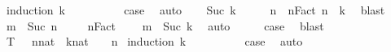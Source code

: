 \begin{isabellebody}
%
\isadelimproof
%
\endisadelimproof
%
\isatagproof
{}\isamarkupfalse%
\ {\isacharparenleft}{\kern0pt}induction\ k{\isacharparenright}{\kern0pt}\isanewline
\ \ \isamarkupfalse%
\ {}\isanewline
\ \ \isamarkupfalse%
\ \isamarkupfalse%
\ {\isacharquery}{\kern0pt}case\ \isamarkupfalse%
\ auto\isanewline
{}\isamarkupfalse%
\isanewline
\ \ \isamarkupfalse%
\ {\isacharparenleft}{\kern0pt}Suc\ k{\isacharparenright}{\kern0pt}\isanewline
\ \ \isamarkupfalse%
\ \isamarkupfalse%
\ n\ \ nFact{\isacharcolon}{\kern0pt}\ {\isachardoublequoteopen}{}{\isacharasterisk}{\kern0pt}n\ {\isachargreater}{\kern0pt}\ k{\isachardoublequoteclose}\ \isamarkupfalse%
\ blast\isanewline
\ \ \isamarkupfalse%
\ {\isacharquery}{\kern0pt}m\ {\isacharequal}{\kern0pt}\ {\isachardoublequoteopen}Suc\ n{\isachardoublequoteclose}\ \isanewline
\ \ \isamarkupfalse%
\ nFact\ \isamarkupfalse%
\ {\isachardoublequoteopen}{}\ {\isacharasterisk}{\kern0pt}\ {\isacharquery}{\kern0pt}m\ {\isachargreater}{\kern0pt}\ Suc\ k{\isachardoublequoteclose}\ \isamarkupfalse%
\ auto\isanewline
\ \ \isamarkupfalse%
\ \isamarkupfalse%
\ {\isacharquery}{\kern0pt}case\ \isamarkupfalse%
\ blast\isanewline
{}\isamarkupfalse%
%
\endisatagproof
{\isafoldproof}%
%
\isadelimproof
\isanewline
%
\endisadelimproof
\isanewline
\isanewline
{}\isamarkupfalse%
\ {\isachardoublequoteopen}T{}{\isachardoublequoteclose}{\isacharcolon}{\kern0pt}\ {\isachardoublequoteopen}\ {\isasymexists}\ {\isacharparenleft}{\kern0pt}n{\isacharcolon}{\kern0pt}{\isacharcolon}{\kern0pt}nat{\isacharparenright}{\kern0pt}\ {\isachardot}{\kern0pt}\ {\isacharparenleft}{\kern0pt}k{\isacharcolon}{\kern0pt}{\isacharcolon}{\kern0pt}nat{\isacharparenright}{\kern0pt}\ {\isacharplus}{\kern0pt}\ {}\ {\isacharless}{\kern0pt}\ n{\isachardoublequoteclose}\isanewline
%
\isadelimproof
%
\endisadelimproof
%
\isatagproof
{}\isamarkupfalse%
\ {\isacharparenleft}{\kern0pt}induction\ k{\isacharparenright}{\kern0pt}\isanewline
\ \ \isamarkupfalse%
\ {}\isanewline
\ \ \isamarkupfalse%
\ \isamarkupfalse%
\ {\isacharquery}{\kern0pt}case\ \isamarkupfalse%
\ auto\isanewline
{}\isamarkupfalse%
\isanewline

\end{isabellebody}
